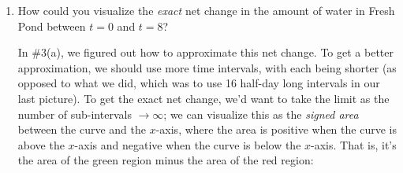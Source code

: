 \documentclass[main]{subfiles}
\begin{document}
\begin{enumerate}
{\begin{enumerate}
    \begin{solution}
    We could get a better approximation by partitioning the interval into between $t = 0$ and $t = 8$ into $16$ half-day sub-intervals:
        \begin{center}
        \end{center}
        We could keep making the subintervals smaller and smaller to get
        better approximations, and the rectangles would get progressively
        thinner.
      \end{solution}  

    

    \item
      \begin{problem}[\vfill]
        How could you visualize the \textit{exact} net change in the amount
        of water in Fresh Pond between $t = 0$ and $t = 8$?
      \end{problem}

    \begin{solution}
      In {{{{\#3}}(a)}}, we figured out how to
      approximate this net change.  To get a better approximation, we
      should use more time intervals, with each being shorter (as opposed
      to what we did, which was to use 16 half-day long intervals in our
      last picture).  To get the exact net change, we'd want to take the
      limit as the number of sub-intervals $\to \infty$; we can visualize
      this as the \emph{signed area} between the curve and the $x$-axis,
      where the area is positive when the curve is above the $x$-axis and
      negative when the curve is below the $x$-axis.  That is, it's the
      area of the green region minus the area of the red region:
      \begin{center}
      \end{center}
    \end{solution}


\end{enumerate}}
\end{enumerate}
\end{document}
